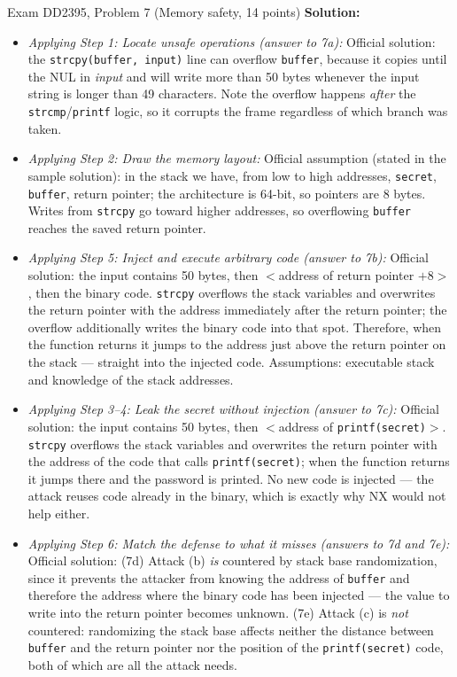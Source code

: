 \documentclass[12pt, a4paper]{article}
\begin{document}
\begin{practicebox}{Exam DD2395, Problem 7 (Memory safety, 14 points)}
\textbf{Solution:}
\begin{itemize}
    \item \textit{Applying Step 1: Locate unsafe operations (answer to 7a):} Official solution: the \texttt{strcpy(buffer, input)} line can overflow \texttt{buffer}, because it copies until the NUL in \emph{input} and will write more than 50 bytes whenever the input string is longer than 49 characters. Note the overflow happens \emph{after} the \texttt{strcmp}/\texttt{printf} logic, so it corrupts the frame regardless of which branch was taken.
    \item \textit{Applying Step 2: Draw the memory layout:} Official assumption (stated in the sample solution): in the stack we have, from low to high addresses, \texttt{secret}, \texttt{buffer}, return pointer; the architecture is 64-bit, so pointers are 8 bytes. Writes from \texttt{strcpy} go toward higher addresses, so overflowing \texttt{buffer} reaches the saved return pointer.
    \item \textit{Applying Step 5: Inject and execute arbitrary code (answer to 7b):} Official solution: the input contains 50 bytes, then $<$address of return pointer $+ 8>$, then the binary code. \texttt{strcpy} overflows the stack variables and overwrites the return pointer with the address immediately after the return pointer; the overflow additionally writes the binary code into that spot. Therefore, when the function returns it jumps to the address just above the return pointer on the stack --- straight into the injected code. Assumptions: executable stack and knowledge of the stack addresses.
    \item \textit{Applying Step 3--4: Leak the secret without injection (answer to 7c):} Official solution: the input contains 50 bytes, then $<$address of \texttt{printf(secret)}$>$. \texttt{strcpy} overflows the stack variables and overwrites the return pointer with the address of the code that calls \texttt{printf(secret)}; when the function returns it jumps there and the password is printed. No new code is injected --- the attack reuses code already in the binary, which is exactly why NX would not help either.
    \item \textit{Applying Step 6: Match the defense to what it misses (answers to 7d and 7e):} Official solution: (7d) Attack (b) \emph{is} countered by stack base randomization, since it prevents the attacker from knowing the address of \texttt{buffer} and therefore the address where the binary code has been injected --- the value to write into the return pointer becomes unknown. (7e) Attack (c) is \emph{not} countered: randomizing the stack base affects neither the distance between \texttt{buffer} and the return pointer nor the position of the \texttt{printf(secret)} code, both of which are all the attack needs.

\end{itemize}
\end{practicebox}
\end{document}
